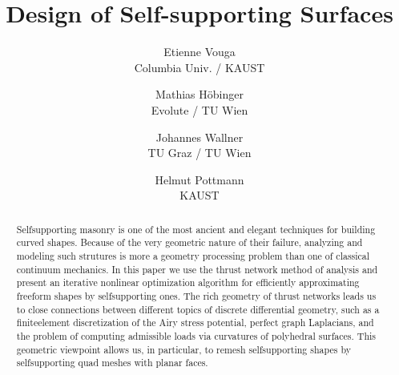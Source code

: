 \documentclass[review]{acmsiggraph}
\title{Design of Self-supporting Surfaces}
\author{
	Etienne Vouga
	\\ Columbia Univ. / KAUST
\and
	Mathias H\"obinger
	\\ Evolute / TU Wien
\and
	Johannes Wallner
	\\ TU Graz / TU Wien
\and 
	Helmut Pottmann
	\\ KAUST
}
\begin{document}



\maketitle


\begin{abstract} Self\dash supporting masonry is one of the most ancient 
and elegant techniques for building curved shapes. Because of the
very geometric nature of their failure, analyzing and modeling such strutures
is more a geometry processing problem than 
one of classical continuum mechanics. In this paper we use the thrust network method 
of analysis and present an iterative nonlinear optimization algorithm for 
efficiently approximating freeform shapes by self\dash supporting ones. 
The rich geometry of thrust networks leads us to
close connections between different topics of discrete differential geometry,
such as a finite\dash element discretization of the Airy stress potential, perfect graph 
Laplacians, and the problem of computing admissible loads via curvatures of polyhedral 
surfaces. This geometric viewpoint allows us, in particular, to remesh self\dash supporting 
shapes by self\dash supporting quad meshes with planar faces.

\end{abstract}
\end{document}

